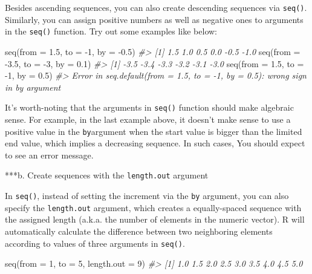 \documentclass[
]{book}
\newenvironment{Shaded}{\begin{snugshade}}{\end{snugshade}}
\newcommand{\AttributeTok}[1]{\textcolor[rgb]{0.77,0.63,0.00}{#1}}
\newcommand{\CommentTok}[1]{\textcolor[rgb]{0.56,0.35,0.01}{\textit{#1}}}
\newcommand{\DecValTok}[1]{\textcolor[rgb]{0.00,0.00,0.81}{#1}}
\newcommand{\FloatTok}[1]{\textcolor[rgb]{0.00,0.00,0.81}{#1}}
\newcommand{\FunctionTok}[1]{\textcolor[rgb]{0.00,0.00,0.00}{#1}}
\newcommand{\NormalTok}[1]{#1}
\newcommand{\SpecialCharTok}[1]{\textcolor[rgb]{0.00,0.00,0.00}{#1}}
\begin{document}
Besides ascending sequences, you can also create descending sequences via \texttt{seq()}. Similarly, you can assign positive numbers as well as negative ones to arguments in the \texttt{seq()} function. Try out some examples like below:

\begin{Shaded}
\begin{Highlighting}[]
\FunctionTok{seq}\NormalTok{(}\AttributeTok{from =} \FloatTok{1.5}\NormalTok{, }\AttributeTok{to =} \SpecialCharTok{{-}}\DecValTok{1}\NormalTok{, }\AttributeTok{by =} \SpecialCharTok{{-}}\FloatTok{0.5}\NormalTok{) }
\CommentTok{\#\textgreater{} [1]  1.5  1.0  0.5  0.0 {-}0.5 {-}1.0}
\FunctionTok{seq}\NormalTok{(}\AttributeTok{from =} \SpecialCharTok{{-}}\FloatTok{3.5}\NormalTok{, }\AttributeTok{to =} \SpecialCharTok{{-}}\DecValTok{3}\NormalTok{, }\AttributeTok{by =} \FloatTok{0.1}\NormalTok{)}
\CommentTok{\#\textgreater{} [1] {-}3.5 {-}3.4 {-}3.3 {-}3.2 {-}3.1 {-}3.0}
\FunctionTok{seq}\NormalTok{(}\AttributeTok{from =} \FloatTok{1.5}\NormalTok{, }\AttributeTok{to =} \SpecialCharTok{{-}}\DecValTok{1}\NormalTok{, }\AttributeTok{by =} \FloatTok{0.5}\NormalTok{) }
\CommentTok{\#\textgreater{} Error in seq.default(from = 1.5, to = {-}1, by = 0.5): wrong sign in \textquotesingle{}by\textquotesingle{} argument}
\end{Highlighting}
\end{Shaded}

It's worth-noting that the arguments in \texttt{seq()} function should make algebraic sense. For example, in the last example above, it doesn't make sense to use a positive value in the \texttt{by}argument when the start value is bigger than the limited end value, which implies a decreasing sequence. In such cases, You should expect to see an error message.

***b. Create sequences with the \texttt{length.out} argument

In \texttt{seq()}, instead of setting the increment via the \texttt{by} argument, you can also specify the \texttt{length.out} argument, which creates a equally-spaced sequence with the assigned length (a.k.a. the number of elements in the numeric vector). R will automatically calculate the difference between two neighboring elements according to values of three arguments in \texttt{seq()}.

\begin{Shaded}
\begin{Highlighting}[]
\FunctionTok{seq}\NormalTok{(}\AttributeTok{from =} \DecValTok{1}\NormalTok{, }\AttributeTok{to =} \DecValTok{5}\NormalTok{, }\AttributeTok{length.out =} \DecValTok{9}\NormalTok{) }
\CommentTok{\#\textgreater{} [1] 1.0 1.5 2.0 2.5 3.0 3.5 4.0 4.5 5.0}
\end{Highlighting}
\end{Shaded}
\end{document}
